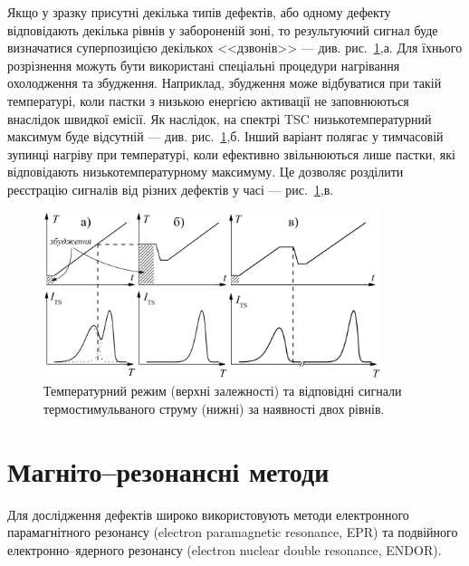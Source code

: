 \documentclass[10pt,a5paper,titlepage,oneside]{book}
\numberwithin{equation}{part}
\begin{document}
Якщо у зразку присутні декілька типів дефектів, або одному дефекту
відповідають декілька рівнів у забороненій зоні,
то результуючий сигнал буде визначатися суперпозицією
декількох <<дзвонів>> --- див. рис.~\ref{F42},а.
Для їхнього розрізнення можуть бути використані спеціальні
процедури нагрівання охолодження та збудження.
Наприклад, збудження може відбуватися при такій температурі,
коли пастки з низькою енергією активації не заповнюються внаслідок
швидкої емісії.
Як наслідок, на спектрі TSC низькотемпературний максимум буде відсутній --- див. рис.~\ref{F42},б.
Інший варіант полягає у тимчасовій зупинці нагріву при температурі, коли ефективно звільнюються
лише пастки, які відповідають низькотемпературному максимуму.
Це дозволяє розділити реєстрацію сигналів від різних дефектів у часі --- рис.~\ref{F42},в.

\begin{figure}[b]
\center
\vspace{-2mm}
\includegraphics[width=0.88\textwidth]{Fig4_2}
\vspace{-3mm}
\caption{Температурний режим (верхні залежності) та
відповідні сигнали термостимульваного струму (нижні)
за наявності двох рівнів.}
\vspace{-3mm}
\label{F42}
\end{figure}


\chapter{Магніто--резонансні методи}\label{chapER}

Для дослідження дефектів широко використовують
методи електронного парамагнітного резонансу
(electron paramagnetic resonance, EPR) та подвійного електронно--ядерного резонансу
(electron nuclear double resonance, ENDOR).
\end{document}
